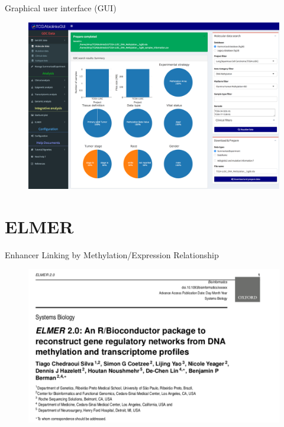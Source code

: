 \documentclass[slidestop,compress,11pt,xcolor=dvipsnames]{beamer}
\begin{document}
\begin{frame}{Graphical user interface (GUI)}
 \vspace*{-0.5cm}
 \begin{figure}
  \centering
   \href{https://youtu.be/Y9d_I9CLaAQ}{\includegraphics[width=1.0\linewidth]{TCGAbiolinks/GUI.png}}
 \end{figure}
\end{frame}


\section{ELMER}

\begin{frame}{ Enhancer Linking by Methylation/Expression Relationship}
 \vspace*{-0.5cm}
 \begin{figure}
  \centering
  \includegraphics[width=1.0\linewidth]{bioinformatics.png}
 \end{figure}
\end{frame}
\end{document}
